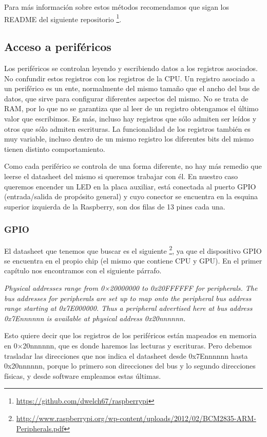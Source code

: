 Para más información sobre estos métodos recomendamos que sigan los
README del siguiente repositorio \footnote{\url{https://github.com/dwelch67/raspberrypi}}.

\subsection{Acceso a periféricos}

Los periféricos se controlan leyendo y escribiendo datos a los registros asociados. No
confundir estos registros con los registros de la CPU. Un registro asociado a un periférico
es un ente, normalmente del mismo tamaño que el ancho del bus de datos, que sirve para
configurar diferentes aspectos del mismo. No se trata de RAM, por lo que no se garantiza que
al leer de un registro obtengamos el último valor que escribimos. Es más, incluso hay
registros que sólo admiten ser leídos y otros que sólo admiten escrituras. La funcionalidad
de los registros también es muy variable, incluso dentro de un mismo registro los diferentes
bits del mismo tienen distinto comportamiento.

Como cada periférico se controla de una forma diferente, no hay más remedio que leerse
el datasheet del mismo si queremos trabajar con él. En nuestro caso queremos encender un LED
en la placa auxiliar, está conectada al puerto GPIO (entrada/salida de propósito general) y
cuyo conector se encuentra en la esquina superior izquierda de la Raspberry, son dos filas
de 13 pines cada una.

\subsubsection{GPIO}

El datasheet que tenemos que buscar es el siguiente
\footnote{\url{http://www.raspberrypi.org/wp-content/uploads/2012/02/BCM2835-ARM-Peripherals.pdf}},
ya que el dispositivo GPIO se encuentra en el propio chip (el mismo que contiene CPU y GPU).
En el primer capítulo nos encontramos con el siguiente párrafo.

{\it Physical addresses range from 0×20000000 to 0x20FFFFFF for peripherals. The bus addresses
for peripherals are set up to map onto the peripheral bus address range starting at
0x7E000000. Thus a peripheral advertised here at bus address 0x7Ennnnnn is available
at physical address 0x20nnnnnn.}

Esto quiere decir que los registros de los periféricos están mapeados en memoria en
0×20nnnnnn, que es donde haremos las lecturas y escrituras. Pero debemos
trasladar las direcciones que nos indica el datasheet desde 0x7Ennnnnn hasta 0x20nnnnnn,
porque lo primero son direcciones del bus y lo segundo direcciones físicas, y desde
software empleamos estas últimas.

